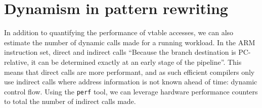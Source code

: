 








\section{Dynamism in pattern rewriting}
\label{chap:dynamism-pattern-rewriting-summary}



In addition to quantifying the performance of \ac{vtable} accesses, we can also estimate the number of dynamic calls made for a running workload.
In the ARM instruction set, direct and indirect calls \cite{armlimitedARMCortexRSeries}
``Because the branch destination is PC-relative, it can be determined exactly at an early stage of the pipeline''. This means that direct calls are more performant, and as such efficient compilers only use indirect calls where address information is not known ahead of time: dynamic control flow.
Using the \texttt{perf} tool, we can leverage hardware performance counters to total the number of indirect calls made.


